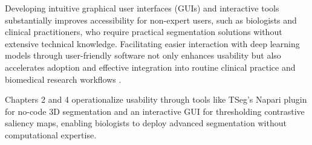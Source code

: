 \documentclass[./dissertation.tex]{subfiles}
\begin{document}
Developing intuitive graphical user interfaces (GUIs) and interactive tools substantially improves accessibility for non-expert users, such as biologists and clinical practitioners, who require practical segmentation solutions without extensive technical knowledge. Facilitating easier interaction with deep learning models through user-friendly software not only enhances usability but also accelerates adoption and effective integration into routine clinical practice and biomedical research workflows \cite{sofroniew2022napari}.

Chapters 2 and 4 operationalize usability through tools like TSeg's Napari plugin for no-code 3D segmentation and an interactive GUI for thresholding contrastive saliency maps, enabling biologists to deploy advanced segmentation without computational expertise.



\end{document}
